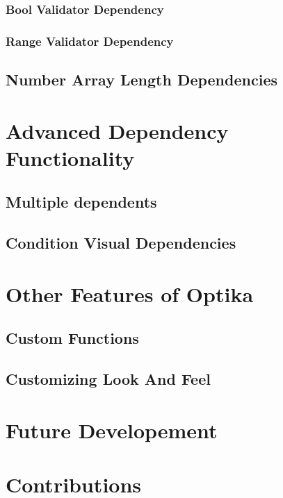 \subsubsection{Bool Validator Dependency}

\subsubsection{Range Validator Dependency}


\subsection{Number Array Length Dependencies}





\section{Advanced Dependency Functionality}

\subsection{Multiple dependents}

\subsection{Condition Visual Dependencies}




\section{Other Features of Optika}

\subsection{Custom Functions}

\subsection{Customizing Look And Feel}


\section{Future Developement}

\section{Contributions}
